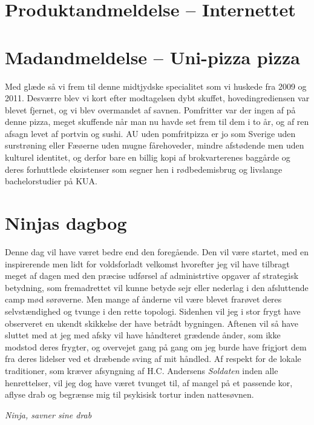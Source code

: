 \begin{minipage}[t]{100mm}
\vspace{1mm}
\section*{Produktandmeldelse -- Internettet}


\vspace{1mm}
\section*{Madandmeldelse -- Uni-pizza pizza}
\vspace{2mm}
Med glæde så vi frem til denne midtjydske specialitet som vi huskede fra 2009 og 2011. Desværre blev vi kort efter modtagelsen dybt skuffet, hovedingrediensen var blevet fjernet, og vi blev overmandet af savnen. Pomfritter var der ingen af på denne pizza, meget skuffende når man nu havde set frem til dem i to år, og af ren afsagn levet af portvin og sushi. AU uden pomfritpizza er jo som Sverige uden surstrøning eller Fæøerne uden mugne fårehoveder, mindre afstødende men uden kulturel identitet, og derfor bare en billig kopi af brokvarterenes baggårde  og deres forhuttlede eksistenser som segner hen i rødbedemisbrug og livslange bachelorstudier på KUA. 

\section*{Ninjas dagbog}
Denne dag vil have været bedre end den foregående. Den vil være startet, med en inspirerende men lidt for voldsforladt velkomst hvorefter jeg vil have tilbragt meget af dagen med den præcise udførsel af administrtive opgaver af strategisk betydning, som fremadrettet vil kunne betyde sejr eller nederlag i den afsluttende camp mød sørøverne. Men mange af ånderne vil være blevet frarøvet deres selvstændighed og tvunge i den rette topologi. Sidenhen vil jeg i stor frygt have observeret en ukendt skikkelse der have betrådt bygningen. Aftenen vil så have sluttet med at jeg med afsky vil have håndteret grædende ånder, som ikke modstod deres frygter, og overvejet gang på gang om jeg burde have frigjort dem fra deres lidelser ved et dræbende sving af mit håndled. Af respekt for de lokale traditioner, som kræver afsyngning af H.C. Andersens \emph{Soldaten} inden alle henrettelser, vil jeg dog have været tvunget til, af mangel på et passende kor, aflyse drab og begrænse mig til psykisisk tortur inden nattesøvnen.

{\flushright\emph{Ninja, savner sine drab}}

\end{minipage}

